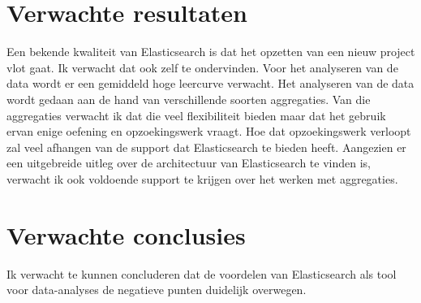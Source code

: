 \documentclass[fleqn,10pt]{voorstel}
\begin{document}
	\section{Verwachte resultaten}
	\label{sec:verwachte_resultaten}
	
	Een bekende kwaliteit van Elasticsearch is dat het opzetten van een nieuw project vlot gaat. Ik verwacht dat ook zelf te ondervinden. Voor het analyseren van de data wordt er een gemiddeld hoge leercurve verwacht. Het analyseren van de data wordt gedaan aan de hand van verschillende soorten aggregaties. Van die aggregaties verwacht ik dat die veel flexibiliteit bieden maar dat het gebruik ervan enige oefening en opzoekingswerk vraagt. Hoe dat opzoekingswerk verloopt zal veel afhangen van de support dat Elasticsearch te bieden heeft. Aangezien er een uitgebreide uitleg over de architectuur van Elasticsearch te vinden is, verwacht ik ook voldoende support te krijgen over het werken met aggregaties.
	
	
	\section{Verwachte conclusies}
	\label{sec:verwachte_conclusies}
	
	Ik verwacht te kunnen concluderen dat de voordelen van Elasticsearch als tool voor data-analyses de negatieve punten duidelijk overwegen. 
	
	
	\printbibliography[heading=bibintoc]
	
\end{document}
